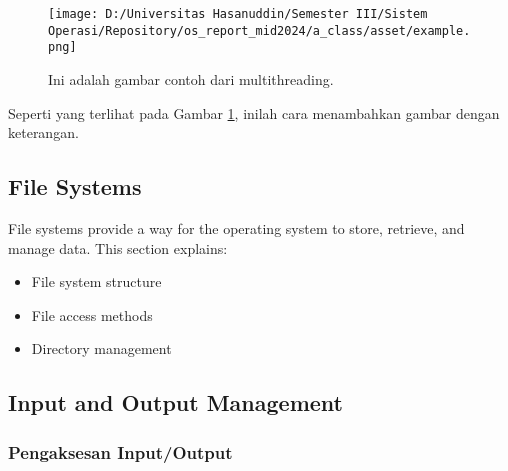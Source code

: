 \documentclass[12pt]{article}
\begin{document}
\begin{figure}[h]
    \centering
    \texttt{[image: D:/Universitas Hasanuddin/Semester III/Sistem Operasi/Repository/os\_report\_mid2024/a\_class/asset/example.png]}  %
    \caption{Ini adalah gambar contoh dari multithreading.}
    \label{fig:contoh_gambar}
\end{figure}

Seperti yang terlihat pada Gambar \ref{fig:contoh_gambar}, inilah cara menambahkan gambar dengan keterangan.

\subsection{File Systems}
File systems provide a way for the operating system to store, retrieve, and manage data. This section explains:
\begin{itemize}
    \item File system structure
    \item File access methods
    \item Directory management
\end{itemize}

\setlength{\parindent}{0pt}

\subsection{Input and Output Management}

\setcounter{subsubsection}{3}
\subsubsection{Pengaksesan Input/Output}
\end{document}

